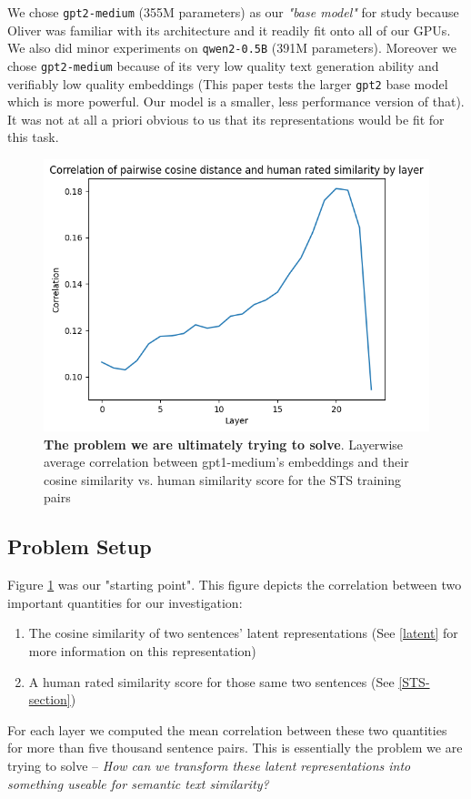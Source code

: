 \documentclass[14pt]{article}
\begin{document}
\begin{enumerate}
\end{enumerate}
We chose \verb|gpt2-medium| (355M parameters) as our \textit{"base model"} for study because Oliver was familiar with its architecture and it readily fit onto all of our GPUs. We also did minor experiments on \verb|qwen2-0.5B| (391M parameters). Moreover we chose \verb|gpt2-medium| because of its very low quality text generation ability and verifiably low quality embeddings \cite{ethayarajh2019contextualcontextualizedwordrepresentations} (This paper tests the larger \verb|gpt2| base model which is more powerful. Our model is a smaller, less performance version of that). It was not at all a priori obvious to us that its representations would be fit for this task.

\begin{figure}[!htb]
    \centering
    \includegraphics[width=0.5\linewidth]{raw_cosine_sim.png}
    \caption{\textbf{The problem we are ultimately trying to solve}. Layerwise average correlation between gpt1-medium's embeddings and their cosine similarity vs. human similarity score for the STS training pairs}
    \label{fig:raw-corr}
\end{figure}

\subsection{Problem Setup} \label{Setup}
Figure \ref{fig:raw-corr} was our "starting point". This figure depicts the correlation between two important quantities for our investigation:
\begin{enumerate}
    \item The cosine similarity of two sentences' latent representations (See \ref{latent} for more information on this representation)
    \item A human rated similarity score for those same two sentences (See \ref{STS-section})
\end{enumerate}
For each layer we computed the mean correlation between these two quantities for more than five thousand sentence pairs. This is essentially the problem we are trying to solve -- \textit{How can we transform these latent representations into something useable for semantic text similarity?}
\end{document}
